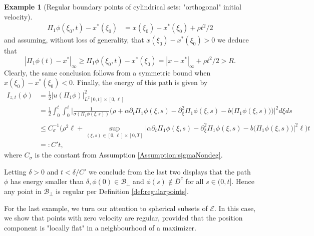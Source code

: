 \documentclass[10pt, reqno]{amsart}
\newcommand{\e}{\mathcal{E}}
\theoremstyle{definition}
\newtheorem{example}{Example}
\numberwithin{lem}{section}
\numberwithin{cor}{section}
\numberwithin{prop}{section}
\numberwithin{thm}{section}
\numberwithin{dfn}{section}
\begin{document}
\begin{example}[Regular boundary points of cylindrical sets: "orthogonal" initial velocity]
 \begin{equation*}
 \begin{aligned}
     \Pi_1\phi(\xi_0, t)-x^*(\xi_0)&=x(\xi_0)-x^*(\xi_0)+\rho t^2/2
 \end{aligned}
 \end{equation*}
 and assuming, without loss of generality, that $x(\xi_0)-x^*(\xi_0)>0$ we deduce that 
 $$ | \Pi_1\phi(t)-x^*|_{\infty}\geq \Pi_1\phi(\xi_0, t)-x^*(\xi_0)=|x-x^*|_{\infty}+\rho t^2/2> R.$$
Clearly, the same conclusion follows from a symmetric bound when $x(\xi_0)-x^*(\xi_0)<0.$ Finally, the energy of this path is given by
\begin{equation*}
    \begin{aligned}
        I_{z, t}(\phi)&=\frac{1}{2}|u(\Pi_1\phi)|^2_{L^2[0,t]\times[0,\ell]}\\&
              =\frac{1}{2}\int_0^t\int_0^\ell\bigg|\frac{1}{\sigma(\Pi_1\phi(\xi,s))}\bigg(\rho+\alpha\partial_t\Pi_1\phi(\xi,s)-\partial_\xi^2\Pi_1\phi(\xi,s)-b\big(\Pi_1\phi(\xi,s)\big)      \bigg)  \bigg|^2d\xi ds\\&
        \\&\leq C_\sigma^{-1}\bigg(\rho^2\ell+\sup_{(\xi,s)\in[0,\ell]\times[0,T]}\bigg| \alpha\partial_t\Pi_1\phi(\xi,s)-\partial_\xi^2\Pi_1\phi(\xi,s)-b\big(\Pi_1\phi(\xi,s)\big)\bigg|^2\ell  \bigg)t\\&
        =: C' t,
    \end{aligned}
\end{equation*}
where $C_\sigma$ is the constant from Assumption \ref{Assumption:sigmaNondeg}.

Letting $\delta>0$ and $t<\delta/C'$ we conclude from the last two displays that the path $\phi$ has energy smaller than $\delta, \phi(0)\in\mathcal{B}_{\perp}$ and $\phi(s)\notin \bar{D}^c$ for all $s\in (0, t].$ Hence any point in $\mathcal{B}_\perp$ is regular per Definition \ref{def:regularpoints}.




 
 
 




\end{example}













For the last example, we turn our attention to spherical subsets of $\e.$ In this case, we show that points with zero velocity are regular, provided that the position component is "locally flat" in a neighbourhood of a maximizer.\\
\end{document}

